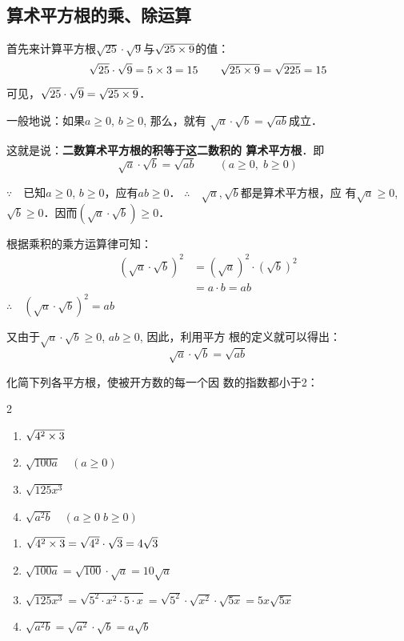 \subsection{算术平方根的乘、除运算}
首先来计算平方根$\sqrt{25}\cdot \sqrt{9}$与$\sqrt{25\times9}$的值：
$$\sqrt{25}\cdot \sqrt{9}=5\times3=15\qquad \sqrt{25\times9}=\sqrt{225}=15$$
可见，$\sqrt{25}\cdot \sqrt{9}=\sqrt{25\times9}$．

一般地说：如果$a\ge 0$, $b\ge 0$, 那么，就有
$\sqrt{a}\cdot \sqrt{b}=\sqrt{ab}$成立．

这就是说：\textbf{二数算术平方根的积等于这二数积的
算术平方根}．即
\[\sqrt{a}\cdot \sqrt{b}=\sqrt{ab}\qquad (a\ge 0,\; b\ge 0)\]

\begin{note}
    $\because\quad$已知$a\ge 0$, $b\ge 0$，应有$ab\ge 0$．
$\therefore\quad \sqrt{a},\sqrt{b}$都是算术平方根，应
有$\sqrt{a}\ge 0$, $\sqrt{b}\ge 0$．因而$(\sqrt{a}\cdot \sqrt{b})\ge 0$．

根据乘积的乘方运算律可知：
\begin{align*}
    (\sqrt{a}\cdot \sqrt{b})^2 &= (\sqrt{a})^2\cdot (\sqrt{b})^2\\
    &=a\cdot b=ab \tag{算术平方根的性质}
\end{align*}
$\therefore\quad \left(\sqrt{a}\cdot \sqrt{b}\right)^2=ab$

又由于$\sqrt{a}\cdot\sqrt{b}\ge 0$, $ab\ge0$, 因此，利用平方
根的定义就可以得出：
\[\sqrt{a}\cdot\sqrt{b}=\sqrt{ab}\]
\end{note}

\begin{example}
化简下列各平方根，使被开方数的每一个因
数的指数都小于2：
\begin{multicols}{2}
\begin{enumerate}
    \item $\sqrt{4^2\times3}$
    \item $\sqrt{100a}\quad (a\ge 0)$
    \item $\sqrt{125x^3}$
    \item $\sqrt{a^2b}\quad (a\ge 0\; b\ge 0)$
\end{enumerate}
\end{multicols}
\end{example}

\begin{solution}
\begin{enumerate}
\item $\sqrt{4^2\times3}=\sqrt{4^2}\cdot \sqrt{3}=4\sqrt{3}$
    \item $\sqrt{100a}=\sqrt{100}\cdot \sqrt{a}=10\sqrt{a} $
    \item $\sqrt{125x^3}=\sqrt{5^2\cdot x^2\cdot 5\cdot x}=\sqrt{5^2}\cdot \sqrt{x^2}\cdot \sqrt{5x}=5x\sqrt{5x}$
    \item $\sqrt{a^2b}=\sqrt{a^2}\cdot \sqrt{b}=a\sqrt{b} $
\end{enumerate}
\end{solution}

